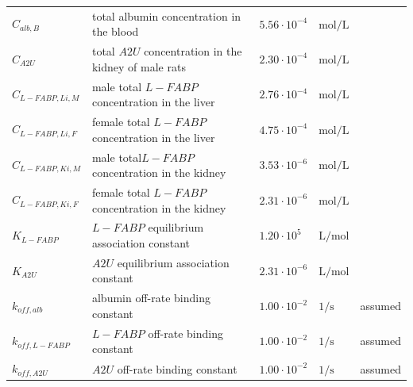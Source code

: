 \documentclass[preprint,12pt,authoryear]{elsarticle}
\begin{document}
\begin{longtable}{P{2cm}P{3.5cm}P{2cm}P{1cm}P{2.5cm}}
$C_{alb,B}$ & total albumin concentration in the blood & $5.56 \cdot 10^{-4}$ & $\text{mol}/\text{L}$ & \citep{rose_2015} \\
$C_{A2U}$ & total $A2U$ concentration in the kidney of male rats & $2.30 \cdot 10^{-4}$ & $\text{mol}/\text{L}$ & \citep{stonard_1986} \\
$C_{L-FABP,Li, M}$ & male total $L-FABP$ concentration in the liver  & $2.76 \cdot 10^{-4}$ & $\text{mol}/\text{L}$ & \citep{ockner_1982} \\
$C_{L-FABP,Li, F}$ & female total $L-FABP$ concentration in the liver  & $4.75 \cdot 10^{-4}$ & $\text{mol}/\text{L}$ & \citep{ockner_1982} \\
$C_{L-FABP,Ki, M}$ & male total$ L-FABP$ concentration in the kidney & $3.53 \cdot 10^{-6}$ & $\text{mol}/\text{L}$ & \citep{maatman_1992} \\
$C_{L-FABP,Ki, F}$ & female total $L-FABP$ concentration in the kidney & $2.31\cdot 10^{-6}$ & $\text{mol}/\text{L}$ & \citep{maatman_1992} \\
\midrule\midrule

$K_{L-FABP}$ & $L-FABP$ equilibrium association constant & $1.20\cdot 10^{5}$ & $\text{L}/\text{mol}$ & \citep{sheng_2018} \\
$K_{A2U}$ & $A2U$ equilibrium association constant & $2.31\cdot 10^{-6}$ & $\text{L}/\text{mol}$ & \citep{han_2004} \\
$k_{off, alb}$ & albumin off-rate binding constant & $1.00\cdot 10^{-2}$ & $1/\text{s}$ & assumed \\
$k_{off, L-FABP}$  & $L-FABP$ off-rate binding constant & $1.00\cdot 10^{-2}$ & $1/\text{s}$ & assumed \\
$k_{off, A2U}$ & $A2U$ off-rate binding constant & $1.00\cdot 10^{-2}$ & $1/\text{s}$ & assumed \\
\midrule\midrule



\end{longtable}
\end{document}
